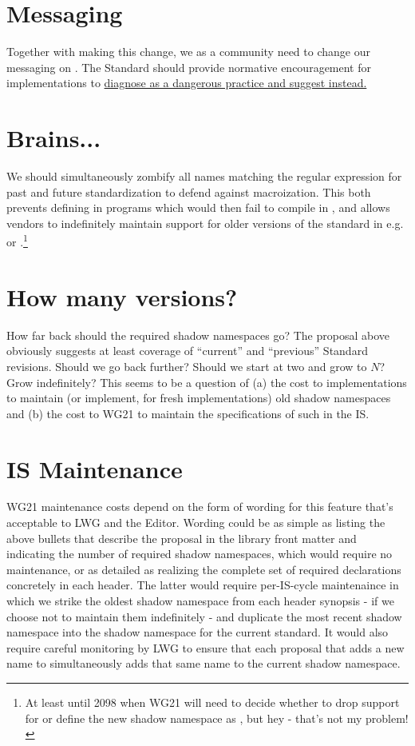 \section{Messaging}
Together with making this change, we as a community need to change our messaging
on . The Standard should provide normative
encouragement for implementations to
\href{https://i.imgflip.com/2n1mwr.jpg}{diagnose 
as a dangerous practice and suggest 
instead.}

\section{Brains...}
We should simultaneously zombify all names matching the regular expression
 for past and future standardization to defend against
macroization. This both prevents defining  in  programs
which would then fail to compile in , and allows vendors to indefinitely
maintain support for older versions of the standard in e.g. 
or .\footnote{At least until 2098 when WG21 will need to
decide whether to drop support for  or define the new shadow namespace
as , but hey - that's not my problem!}

\section{How many versions?}
How far back should the required shadow namespaces go? The proposal above
obviously suggests at least coverage of ``current'' and ``previous'' Standard
revisions. Should we go back further? Should we start at two and grow to $N$?
Grow indefinitely? This seems to be a question of (a) the cost to
implementations to maintain (or implement, for fresh implementations) old shadow
namespaces and (b) the cost to WG21 to maintain the specifications of such in
the IS.

\section{IS Maintenance}
WG21 maintenance costs depend on the form of wording for this feature that's
acceptable to LWG and the Editor. Wording could be as simple as listing the
above bullets that describe the proposal in the library front matter and
indicating the number of required shadow namespaces,
which would require no maintenance,
or as detailed as realizing the complete set of required declarations concretely
in each header. The latter would require per-IS-cycle maintenaince in which we
strike the oldest shadow namespace from each header synopsis - if we choose not
to maintain them indefinitely - and duplicate the most recent shadow namespace
into the shadow namespace for the current standard. It would also require
careful monitoring by LWG to ensure that each proposal that adds a new name to
 simultaneously adds that same name to the current shadow namespace.

